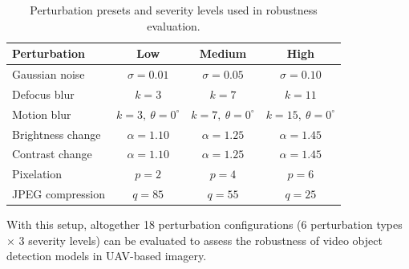 \documentclass[final,twoside]{vutinfth}
\begin{document}
\begin{table}[htbp]
\centering
\caption{Perturbation presets and severity levels used in robustness evaluation.}
\begin{tabular}{l c c c}
\toprule
\rowcolor{tableheader}
\textbf{Perturbation} & \textbf{Low} & \textbf{Medium} & \textbf{High} \\
\midrule
Gaussian noise
& $\sigma = 0.01$
& $\sigma = 0.05$
& $\sigma = 0.10$ \\
Defocus blur
& $k = 3$
& $k = 7$
& $k = 11$ \\
Motion blur
& $k = 3,\ \theta = 0^\circ$
& $k = 7,\ \theta = 0^\circ$
& $k = 15,\ \theta = 0^\circ$ \\
Brightness change
& $\alpha = 1.10$
& $\alpha = 1.25$
& $\alpha = 1.45$ \\
Contrast change
& $\alpha = 1.10$
& $\alpha = 1.25$
& $\alpha = 1.45$ \\
Pixelation
& $p = 2$
& $p = 4$
& $p = 6$ \\
JPEG compression
& $q = 85$
& $q = 55$
& $q = 25$ \\
\bottomrule
\end{tabular}
\end{table}

With this setup, altogether 18 perturbation configurations (6 perturbation types $\times$ 3 severity levels) can be evaluated to assess the robustness of video object detection models in UAV-based imagery.
\end{document}
